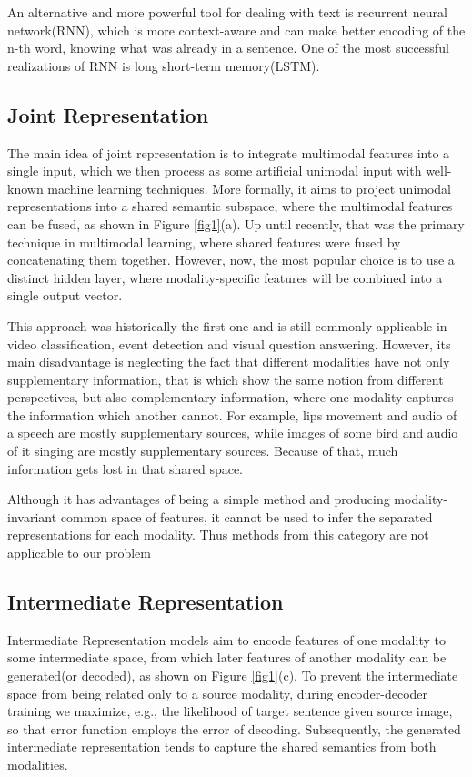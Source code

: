\documentclass[runningheads]{llncs}
\begin{document}
An alternative and more powerful tool for dealing with text is recurrent neural network(RNN)\cite{ref_rnn}, which is more context-aware and can make better encoding of the n-th word, knowing what was already in a sentence. One of the most successful realizations of RNN is long short-term memory(LSTM)\cite{ref_lstm}.

\subsection{Joint Representation}
The main idea of joint representation is to integrate multimodal features into a single input, which we then process as some artificial unimodal input with well-known machine learning techniques. More formally, it aims to project unimodal representations into a shared semantic subspace, where the multimodal features can be fused\cite{ref_survey_baltrusaitis},  as shown in Figure \ref{fig1}(a). Up until recently, that was the primary technique in multimodal learning, where shared features were fused by concatenating them together. However, now,  the most popular choice is to use a distinct hidden layer, where modality-specific features will be combined into a single output vector.

This approach was historically the first one and is still commonly applicable in video classification\cite{ref_video_class}, event detection\cite{ref_event_detection} and visual question answering\cite{ref_visual_question_answ}. However, its main disadvantage is neglecting the fact that different modalities have not only supplementary information, that is which show the same notion from different perspectives, but also complementary information, where one modality captures the information which another cannot. For example, lips movement and audio of a speech are mostly supplementary sources, while images of some bird and audio of it singing are mostly supplementary sources. Because of that, much information gets lost in that shared space. 

Although it has advantages of being a simple method and producing modality-invariant common space of features, it cannot be used to infer the separated representations for each modality\cite{ref_survey}. Thus methods from this category are not applicable to our problem

\subsection{Intermediate Representation}
Intermediate Representation models aim to encode features of one modality to some intermediate space, from which later features of another modality can be generated(or decoded), as shown on Figure \ref{fig1}(c). To prevent the intermediate space from being related only to a source modality, during encoder-decoder training we maximize, e.g., the likelihood of target sentence given source image, so that error function employs the error of decoding. Subsequently, the generated intermediate representation tends to capture the shared semantics from both modalities\cite{ref_survey}. 
\end{document}
